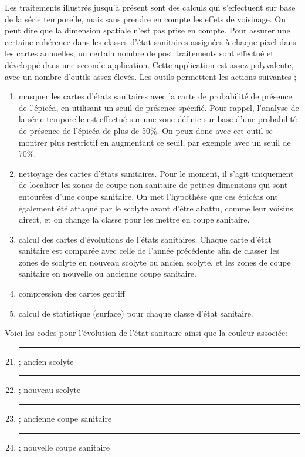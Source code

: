 \documentclass[a4paper, 12pt]{article} %
\newcommand\crule[3][black]{\textcolor{#1}{\rule{#2}{#3}}}
\begin{document}
Les traitements illustrés jusqu'à présent sont des calculs qui s'effectuent sur base de la série temporelle, mais sans prendre en compte les effets de voisinage. On peut dire que la dimension spatiale n'est pas prise en compte. Pour assurer une certaine cohérence dans les classes d'état sanitaires assignées à chaque pixel dans les cartes annuelles, un certain nombre de post traitements sont effectué et développé dans une seconde application. Cette application est assez polyvalente, avec un nombre d'outils assez élevés. Les outils permettent les actions suivantes ;
\begin{enumerate}\addtocounter{enumi}{-1}
	
	\item masquer les cartes d'états sanitaires avec la carte de probabilité de présence de l'épicéa, en utilisant un seuil de présence spécifié. Pour rappel, l'analyse de la série temporelle est effectué sur une zone définie sur base d'une probabilité de présence de l'épicéa de plus de 50\%. On peux donc avec cet outil se montrer plus restrictif en augmentant ce seuil, par exemple avec un seuil de 70\%.
	\item nettoyage des cartes d'états sanitaires. Pour le moment, il s'agit uniquement de localiser les zones de coupe non-sanitaire de petites dimensions qui sont entourées d'une coupe sanitaire. On met l'hypothèse que ces épicéas ont également été attaqué par le scolyte avant d'être abattu, comme leur voisins direct, et on change la classe pour les mettre en coupe sanitaire.
	\item calcul des cartes d'évolutions de l'états sanitaires. Chaque carte d'état sanitaire est comparée avec celle de l'année précédente afin de classer les zones de scolyte en nouveau scolyte ou ancien scolyte, et les zones de coupe sanitaire en nouvelle ou ancienne coupe sanitaire.
	\item  compression des cartes geotiff
	\item calcul de statistique (surface) pour chaque classe d'état sanitaire.
\end{enumerate}

Voici les codes pour l'évolution de l'état sanitaire ainsi que la couleur associée:
\begin{enumerate}\setcounter{enumi}{20}
	\item \crule[cl21]{1cm}{1cm} ; ancien scolyte
	\item \crule[cl22]{1cm}{1cm} ; nouveau scolyte
	\setcounter{enumi}{40}
	\item \crule[cl41]{1cm}{1cm} ; ancienne coupe sanitaire
	\item \crule[cl42]{1cm}{1cm} ; nouvelle coupe sanitaire
\end{enumerate} 
\end{document}
